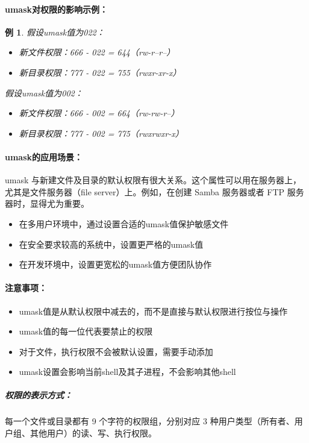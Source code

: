 \documentclass[12pt,UTF8]{ctexbook}
\newtheorem{example}{例}[chapter]
\begin{document}
\paragraph{umask对权限的影响示例：}
\begin{example}
假设umask值为022：
\begin{itemize}
    \item 新文件权限：666 - 022 = 644（rw-r--r--）
    \item 新目录权限：777 - 022 = 755（rwxr-xr-x）
\end{itemize}

假设umask值为002：
\begin{itemize}
    \item 新文件权限：666 - 002 = 664（rw-rw-r--）
    \item 新目录权限：777 - 002 = 775（rwxrwxr-x）
\end{itemize}
\end{example}

\paragraph{umask的应用场景：}
umask 与新建文件及目录的默认权限有很大关系。这个属性可以用在服务器上，尤其是文件服务器（file server）上。例如，在创建 Samba 服务器或者 FTP 服务器时，显得尤为重要。

\begin{itemize}
    \item 在多用户环境中，通过设置合适的umask值保护敏感文件
    \item 在安全要求较高的系统中，设置更严格的umask值
    \item 在开发环境中，设置更宽松的umask值方便团队协作
\end{itemize}

\paragraph{注意事项：}
\begin{itemize}
    \item umask值是从默认权限中减去的，而不是直接与默认权限进行按位与操作
    \item umask值的每一位代表要禁止的权限
    \item 对于文件，执行权限不会被默认设置，需要手动添加
    \item umask设置会影响当前shell及其子进程，不会影响其他shell
\end{itemize}

\subparagraph{权限的表示方式：}
每一个文件或目录都有 9 个字符的权限组，分别对应 3 种用户类型（所有者、用户组、其他用户）的读、写、执行权限。
\end{document}
